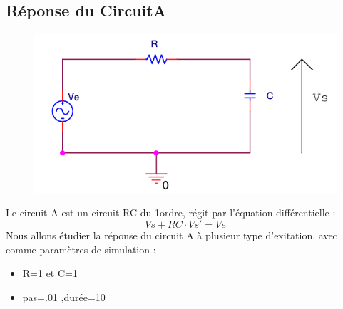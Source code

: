 \documentclass[a4paper,11pt]{article}
\begin{document}
\newpage


  \subsection{Réponse du CircuitA}
  \begin{figure}[H]
	 \begin{center}
	\includegraphics[scale=.5]{circuitA}
	\end{center}
      \end{figure}
   Le circuit A est un circuit RC du 1\ier ordre, régit par l'équation différentielle :
   \begin{equation*}
    Vs+RC\cdot Vs'=Ve
   \end{equation*}
  Nous allons étudier la réponse du circuit A à plusieur type d'exitation, avec comme paramètres de simulation :  \\
  \begin{itemize}
   \item R=1 et C=1
     \item pas=.01 ,durée=10 
  \end{itemize}
\end{document}
